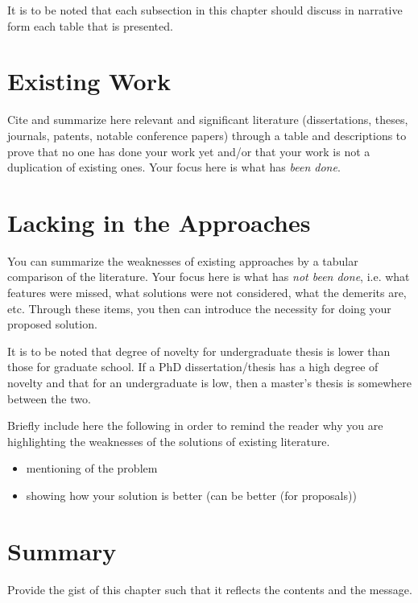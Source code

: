It is to be noted that each subsection in this chapter should discuss in narrative form each table that is presented.  

\section{Existing Work}

Cite and summarize here relevant and significant literature (dissertations, theses, journals, patents, notable conference papers) through a table and descriptions to prove that no one has done your work yet and/or that your work is not a duplication of existing ones. Your focus here is what has \emph{been done}.

\graytx{\Blindtext}

\section{Lacking in the Approaches}

You can summarize the weaknesses of existing approaches by a tabular comparison of the literature. Your focus here is what has \emph{not been done}, i.e. what features were missed, what solutions were not considered, what the demerits are, etc.  Through these items, you then can introduce the necessity for doing your proposed solution.  

It is to be noted that degree of novelty for undergraduate thesis is lower than those for graduate school. If a PhD dissertation/thesis has a high degree of novelty and that for an undergraduate is low, then a master's thesis is somewhere between the two.

Briefly include here the following in order to remind the reader why you are highlighting the weaknesses of the solutions of existing literature. 

\begin{itemize}
	\item mentioning of the problem
	\item showing how your solution is better (can be better (for proposals))
\end{itemize}


\graytx{\Blindtext}

\section{Summary}

Provide the gist of this chapter such that it reflects the contents and the message.




